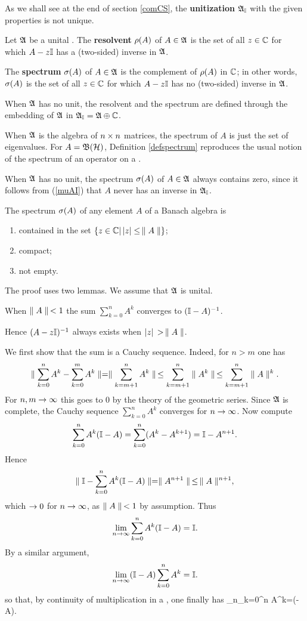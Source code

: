 As we shall see at the end of section \ref{comCS}, the {\bf
unitization} ${\frak A}_{\Bbb I}$ with the given properties is not unique.
\begin{Definition}
Let ${\frak A}$ be a unital \BA. The {\bf resolvent} $\rho(A)$ of $A\in{\frak A}$ is
the set of all $z\in{\Bbb C}$ for which $A-z{\Bbb I}$ has a (two-sided) inverse in
${\frak A}$.

The {\bf spectrum} $\sigma(A)$ of $A\in{\frak A}$ is the complement of $\rho(A)$
in ${\Bbb C}$; in other words, $\sigma(A)$ is the set of all $z\in{\Bbb C}$ for which
$A-z{\Bbb I}$ has no (two-sided) inverse in ${\frak A}$.

When ${\frak A}$ has no unit, the resolvent and the spectrum are defined
through the embedding of ${\frak A}$ in ${\frak A}_{\Bbb I}={\frak A}\oplus{\Bbb C}$.  \end{Definition}

When ${\frak A}$ is the algebra of $n\times n$ matrices, the spectrum of $A$ is
just the set of eigenvalues. For $A={\frak B}({\cal H})$, Definition \ref{defspectrum}
reproduces the usual notion of the spectrum of an operator on a \Hs.

When ${\frak A}$ has no unit, the spectrum $\sigma(A)$ of $A\in{\frak A}$ always
contains zero, since it follows from (\ref{muAI}) that $A$ never has
an inverse in ${\frak A}_{\Bbb I}$.
\begin{Theorem}
The spectrum $\sigma(A)$ of any element $A$ of a Banach algebra is
\begin{enumerate}
\item
 contained in the set $\{z\in{\Bbb C}|\, |z|\leq\,\parallel A\parallel\}$;
\item
compact;
\item
not empty.
\end{enumerate} \end{Theorem}

The proof uses two lemmas. We assume that ${\frak A}$ is unital.
\begin{Lemma}
When $\parallel A\parallel\,< 1$ the sum $\sum_{k=0}^n A^k$ converges to
$({\Bbb I}-A)^{-1}$.

Hence $(A-z{\Bbb I})^{-1}$ always exists when $|z|\,>\,\parallel A\parallel$. \end{Lemma}

We first show that the sum is a Cauchy sequence. Indeed, for $n>m$ one
has
$$
\parallel \sum_{k=0}^n A^k-\sum_{k=0}^m A^k\parallel=\parallel\sum_{k=m+1}^n A^k\parallel\,\leq
 \sum_{k=m+1}^n \parallel A^k\parallel\,\leq \sum_{k=m+1}^n \parallel A\parallel^k.
$$ 
For $n,m\rightarrow\infty$ this goes to 0 by the theory of the geometric
series.  Since ${\frak A}$ is complete, the Cauchy sequence $\sum_{k=0}^n
A^k$ converges for $n\rightarrow\infty$. Now compute
$$
\sum_{k=0}^n A^k({\Bbb I}-A)=\sum_{k=0}^n (A^k-A^{k+1})={\Bbb I}-A^{n+1}.
$$
Hence
$$
\parallel{\Bbb I}-\sum_{k=0}^n A^k({\Bbb I}-A)\parallel=\parallel A^{n+1}\parallel\,\leq\,\parallel A\parallel^{n+1},
$$
which $\rightarrow 0$ for $n\rightarrow\infty$, as $\parallel A\parallel\,< 1$ by assumption.
Thus $$ \lim_{n\rightarrow\infty}\sum_{k=0}^n A^k({\Bbb I}-A)={\Bbb I}.$$ By a similar
argument,
 $$
\lim_{n\rightarrow\infty}({\Bbb I}-A)\sum_{k=0}^n A^k={\Bbb I}.$$ so that, by continuity
of multiplication in a \BA, one finally has \be
\lim_{n\raw\infty}\sum_{k=0}^n A^k=(\I-A)\inv.  \ee

